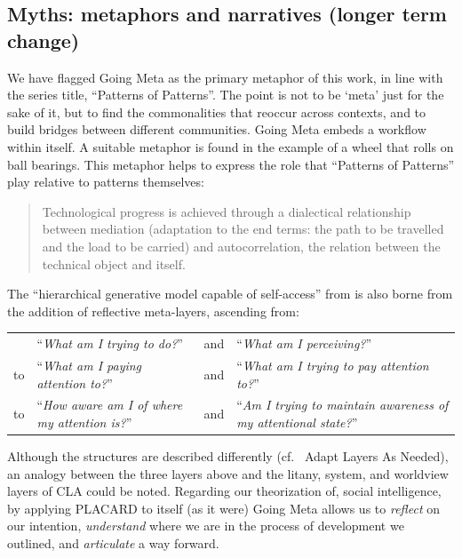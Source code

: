 \documentclass[acmlarge,timestamp]{acmart}
\begin{document}
\subsection{Myths: metaphors and narratives (longer term change)}
We have flagged {\sc Going Meta} as the primary metaphor of this work,
in line with the series title, “Patterns of Patterns”.  The point is
not to be ‘meta’ just for the sake of it, but to find the
commonalities that reoccur across contexts, and to build bridges
between different communities.  {\sc Going Meta} embeds a workflow
within itself.  A suitable metaphor is found in the example of a wheel
that rolls on ball bearings.  This metaphor helps to express the role
that “Patterns of Patterns” play relative to patterns themselves:
\begin{quote}
Technological progress is achieved through a dialectical relationship
between mediation (adaptation to the end terms: the path to be
travelled and the load to be carried) and autocorrelation, the
relation between the technical object and
itself. \cite{Simondon2005-pq}
\end{quote}
The “hierarchical generative model capable of self-access” from
\citet{albarracin2023designing} is also borne from the addition of
reflective meta-layers, ascending from:

{
\renewcommand*{\arraystretch}{1.2}
\begin{tabular}{lllp{}}
  &``\emph{What am I trying to do?}''&and&``\emph{What am I perceiving?}''\\
to&``\emph{What am I paying attention to?}''&and&``\emph{What am I trying to pay attention to?}''\\
to&``\emph{How aware am I of where my attention is?}''&and&``\emph{Am I trying to maintain awareness of my attentional state?}''
\end{tabular}
}

\medskip
\noindent Although the structures are described differently (cf.~{\sc
  Adapt Layers As Needed}), an analogy between the three layers above
and the litany, system, and worldview layers of CLA could be noted.
Regarding our theorization of, social intelligence, by applying
PLACARD to itself (as it were) {\sc Going Meta} allows us to
\emph{reflect} on our intention, \emph{understand} where we are in the
process of development we outlined, and \emph{articulate} a way
forward.


\renewcommand\bibname{References}
\renewcommand\refname{References}



\end{document}
